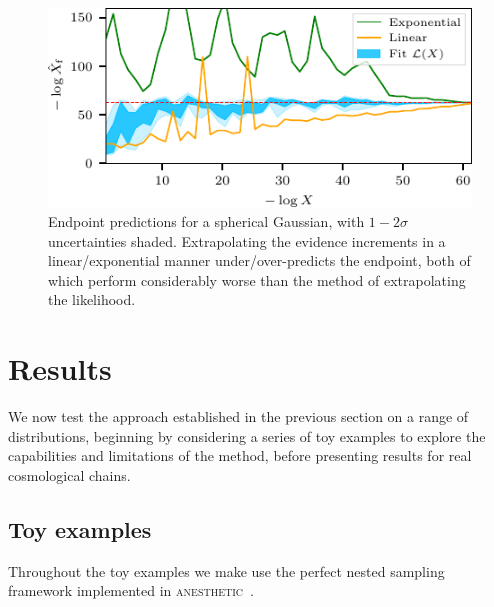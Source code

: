 \documentclass[usenatbib]{mnras}
\begin{document}
\begin{figure}
\includegraphics{figures/inc_predictions.pdf}
\caption{Endpoint predictions for a spherical Gaussian, with $1-2\sigma$ uncertainties shaded. Extrapolating the evidence increments in a linear/exponential manner under/over-predicts the endpoint, both of which perform considerably worse than the method of extrapolating the likelihood.}
\label{fig:inc_predictions}
\end{figure}

\section{Results}\label{sec:results}
We now test the approach established in the previous section on a range of distributions, beginning by considering a series of toy examples to explore the capabilities and limitations of the method, before presenting results for real cosmological chains.
\subsection{Toy examples}\label{sec:logXfs_toy}
Throughout the toy examples we make use the perfect nested sampling~\citep{Keeton_2011,2018BayAn..13..873H} framework implemented in \textsc{anesthetic}~\citep{anesthetic}.
\end{document}
